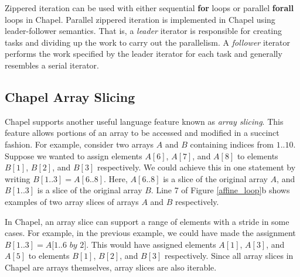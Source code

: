 Zippered iteration can be used with either sequential \textbf{for} loops or parallel \textbf{forall} loops in Chapel. Parallel zippered iteration is implemented in Chapel using leader-follower semantics. That is, a \textit{leader} iterator is responsible for creating tasks and dividing up the work to carry out the parallelism. A \textit{follower} iterator performs the work specified by the leader iterator for each task and generally resembles a serial iterator. 

\subsection{Chapel Array Slicing}\label{sec:array_slicing}

Chapel supports another useful language feature known as \textit{array slicing}. This feature allows portions of an array to be accessed and modified in a succinct fashion. For example, consider two arrays $A$ and $B$ containing indices from $1..10$. Suppose we wanted to assign elements $A[6]$, $A[7]$, and $A[8]$ to elements $B[1]$, $B[2]$, and $B[3]$ respectively. We could achieve this in one statement by writing $B[1..3] = A[6..8]$. Here, $A[6..8]$ is a slice of the original array $A$, and $B[1..3]$ is a slice of the original array $B$. Line 7 of Figure \ref{affine_loop}b shows examples of two array slices of arrays $A$ and $B$ respectively.

In Chapel, an array slice can support a range of elements with a stride in some cases. For example, in the previous example, we could have made the assignment $B[1..3] = A[1..6$ $by$ $2]$. This would have assigned elements $A[1]$, $A[3]$, and $A[5]$ to elements $B[1]$, $B[2]$, and $B[3]$ respectively. Since all array slices in Chapel are arrays themselves, array slices are also iterable. 

